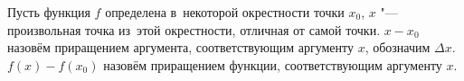 
    Пусть функция $f$ определена в~некоторой окрестности точки $x_0$, $x$ "--- произвольная точка из~этой окрестности, отличная от самой точки. $x-x_0$ назовём приращением аргумента, соответствующим аргументу $x$, обозначим $\Delta x$.
    $f(x)-f(x_0)$ назовём приращением функции, соответствующим аргументу $x$.
